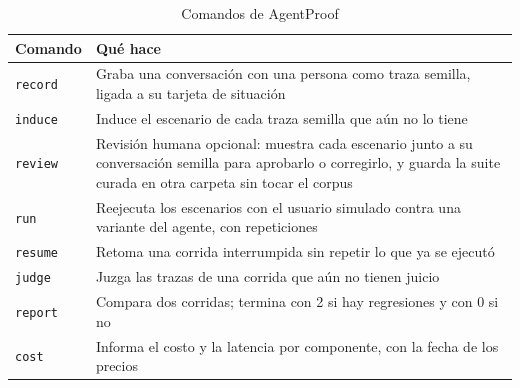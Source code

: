 \begin{table}[H]
  \caption{Comandos de AgentProof}
  \label{tab:comandos}
  \begin{tabular}{|>{\raggedright\arraybackslash}p{0.8in}|>{\raggedright\arraybackslash}p{5in}|}
    \hline
    \textbf{Comando} & \textbf{Qué hace} \\ \hline
    \texttt{record} & Graba una conversación con una persona como traza semilla, ligada a su tarjeta de situación \\ \hline
    \texttt{induce} & Induce el escenario de cada traza semilla que aún no lo tiene \\ \hline
    \texttt{review} & Revisión humana opcional: muestra cada escenario junto a su conversación semilla para aprobarlo o corregirlo, y guarda la suite curada en otra carpeta sin tocar el corpus \\ \hline
    \texttt{run} & Reejecuta los escenarios con el usuario simulado contra una variante del agente, con repeticiones \\ \hline
    \texttt{resume} & Retoma una corrida interrumpida sin repetir lo que ya se ejecutó \\ \hline
    \texttt{judge} & Juzga las trazas de una corrida que aún no tienen juicio \\ \hline
    \texttt{report} & Compara dos corridas; termina con 2 si hay regresiones y con 0 si no \\ \hline
    \texttt{cost} & Informa el costo y la latencia por componente, con la fecha de los precios \\ \hline
  \end{tabular}
\end{table}


